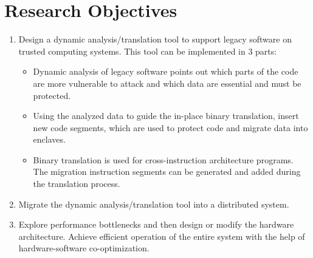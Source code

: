 \section{Research Objectives}
\begin{enumerate}
    \item Design a dynamic analysis/translation tool to support legacy
    software on trusted computing systems. This tool can be implemented
    in 3 parts:
    \begin{itemize}
        \item Dynamic analysis of legacy software points out which parts of the code are
        more vulnerable to attack and which data are essential and must be protected.
        \item Using the analyzed data to guide the in-place binary translation,
        insert new code segments, which are used to protect code and migrate data into enclaves.
        \item Binary translation is used for cross-instruction architecture programs. The migration
        instruction segments can be generated and added during the translation process.
    \end{itemize}
    \item Migrate the dynamic analysis/translation tool into a distributed system.
    \item Explore performance bottlenecks and then design or modify the hardware architecture.
    Achieve efficient operation of the entire system with the help of hardware-software
    co-optimization.
\end{enumerate}